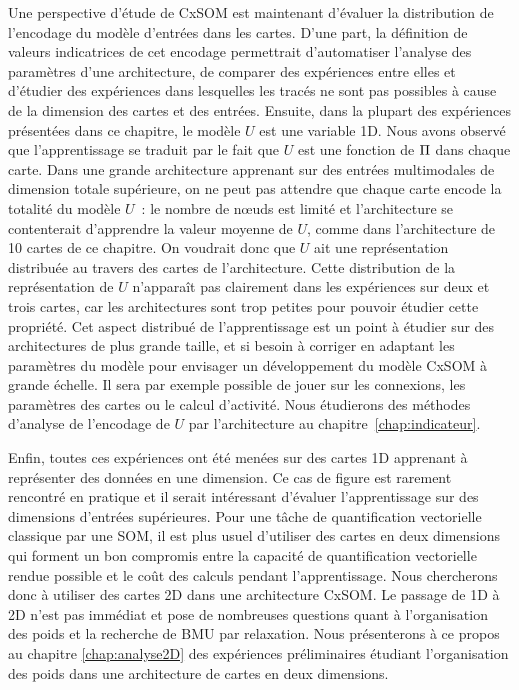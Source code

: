 \documentclass[../main]{subfiles}
\begin{document}
Une perspective d'étude de CxSOM est maintenant d'évaluer la distribution de l'encodage du modèle d'entrées dans les cartes. 
D'une part, la définition de valeurs indicatrices de cet encodage permettrait d'automatiser l'analyse des paramètres d'une architecture, de comparer des expériences entre elles et d'étudier des expériences dans lesquelles les tracés ne sont pas possibles à cause de la dimension des cartes et des entrées.
Ensuite, dans la plupart des expériences présentées dans ce chapitre, le modèle $U$ est une variable 1D. 
Nous avons observé que l'apprentissage se traduit par le fait que $U$ est une fonction de $\Pi$ dans chaque carte.
Dans une grande architecture apprenant sur des entrées multimodales de dimension totale supérieure, on ne peut pas attendre que chaque carte encode la totalité du modèle $U$~: le nombre de n\oe{}uds est limité et l'architecture se contenterait d'apprendre la valeur moyenne de $U$, comme dans l'architecture de 10 cartes de ce chapitre.
On voudrait donc que $U$ ait une représentation distribuée au travers des cartes de l'architecture. 
Cette distribution de la représentation de $U$ n'apparaît pas clairement dans les expériences sur deux et trois cartes, car les architectures sont trop petites pour pouvoir étudier cette propriété.
Cet aspect distribué de l'apprentissage est un point à étudier sur des architectures de plus grande taille, et si besoin à corriger en adaptant les paramètres du modèle pour envisager un développement du modèle CxSOM à grande échelle. 
Il sera par exemple possible de jouer sur les connexions, les paramètres des cartes ou le calcul d'activité.
Nous étudierons des méthodes d'analyse de l'encodage de $U$ par l'architecture au chapitre~\ref{chap:indicateur}.

Enfin, toutes ces expériences ont été menées sur des cartes 1D apprenant à représenter des données en une dimension. Ce cas de figure est rarement rencontré en pratique et il serait intéressant d'évaluer l'apprentissage sur des dimensions d'entrées supérieures. Pour une tâche de quantification vectorielle classique par une SOM, il est plus usuel d'utiliser des cartes en deux dimensions qui forment un bon compromis entre la capacité de quantification vectorielle rendue possible et le coût des calculs pendant l'apprentissage. Nous chercherons donc à utiliser des cartes 2D dans une architecture CxSOM. Le passage de 1D à 2D n'est pas immédiat et pose de nombreuses questions quant à l'organisation des poids et la recherche de BMU par relaxation. 
Nous présenterons à ce propos au chapitre \ref{chap:analyse2D} des expériences préliminaires étudiant l'organisation des poids dans une architecture de cartes en deux dimensions.

\ifSubfilesClassLoaded{
    \printbibliography
}{}
\end{document}
